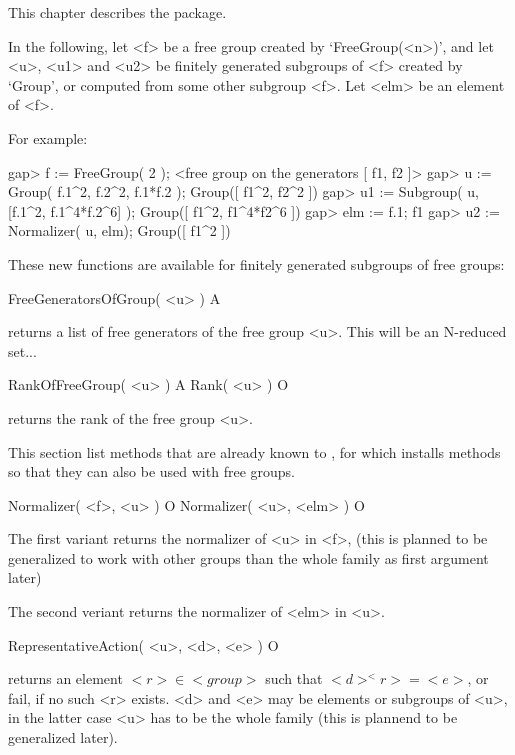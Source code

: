 

This chapter  describes  the  {\FGA}  package.

In the following, let <f> be a free group created by `FreeGroup(<n>)',
and let <u>, <u1> and <u2> be finitely generated subgroups of <f> created
by `Group', or computed from some other subgroup <f>.  Let <elm> be an
element of <f>.

For example:

\beginexample
gap> f := FreeGroup( 2 );                                             
<free group on the generators [ f1, f2 ]>
gap> u := Group( f.1^2, f.2^2, f.1*f.2 );
Group([ f1^2, f2^2 ])
gap> u1 := Subgroup( u, [f.1^2, f.1^4*f.2^6] );
Group([ f1^2, f1^4*f2^6 ])
gap> elm := f.1;
f1
gap> u2 := Normalizer( u, elm);
Group([ f1^2 ])
\endexample


These new functions are available for finitely generated subgroups of
free groups:

\>FreeGeneratorsOfGroup( <u> ) A

returns a list of free generators of the free group <u>.
This will be an N-reduced set...

\>RankOfFreeGroup( <u> ) A
\>Rank( <u> ) O

returns the rank of the free group <u>.


This section list methods that are already known to {\GAP}, for which
{\FGA} installs methods so that they can also be used with free groups.

\>Normalizer( <f>, <u> ) O
\>Normalizer( <u>, <elm> ) O

The first variant returns the normalizer of <u> in <f>, (this is planned
to be generalized to work with other groups than the whole family as
first argument later)

The second veriant returns the normalizer of <elm> in <u>.

\>RepresentativeAction( <u>, <d>, <e> ) O

returns an element $ <r> \in <group> $ such that $<d>^<r>=<e>$, or
fail, if no such <r> exists.
<d> and <e> may be elements or subgroups of <u>, in the latter case
<u> has to be the whole family (this is plannend to be generalized
later).

